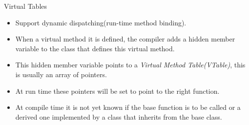 \begin{frame}{Virtual Tables} 
    \begin{itemize}
        \item Support dynamic dispatching(run-time method binding).
        \item When a virtual method it is defined, the compiler adds a hidden member variable to the class that defines this virtual method.
        \item This hidden member variable points to a \emph{Virtual Method Table(VTable)}, this is usually an array of pointers.
        \item At run time these pointers will be set to point to the right function. 
        \item At compile time it is not yet known if the base function is to be called or a derived one implemented  by a class that inherits from the base class.
    \end{itemize}
\end{frame}

